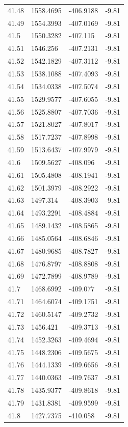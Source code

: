 \begin{table}[H]
\begin{tabular}{llll}
41.48 & 1558.4695 & -406.9188 & -9.81 \\
41.49 & 1554.3993 & -407.0169 & -9.81 \\
41.5 & 1550.3282 & -407.115 & -9.81 \\
41.51 & 1546.256 & -407.2131 & -9.81 \\
41.52 & 1542.1829 & -407.3112 & -9.81 \\
41.53 & 1538.1088 & -407.4093 & -9.81 \\
41.54 & 1534.0338 & -407.5074 & -9.81 \\
41.55 & 1529.9577 & -407.6055 & -9.81 \\
41.56 & 1525.8807 & -407.7036 & -9.81 \\
41.57 & 1521.8027 & -407.8017 & -9.81 \\
41.58 & 1517.7237 & -407.8998 & -9.81 \\
41.59 & 1513.6437 & -407.9979 & -9.81 \\
41.6 & 1509.5627 & -408.096 & -9.81 \\
41.61 & 1505.4808 & -408.1941 & -9.81 \\
41.62 & 1501.3979 & -408.2922 & -9.81 \\
41.63 & 1497.314 & -408.3903 & -9.81 \\
41.64 & 1493.2291 & -408.4884 & -9.81 \\
41.65 & 1489.1432 & -408.5865 & -9.81 \\
41.66 & 1485.0564 & -408.6846 & -9.81 \\
41.67 & 1480.9685 & -408.7827 & -9.81 \\
41.68 & 1476.8797 & -408.8808 & -9.81 \\
41.69 & 1472.7899 & -408.9789 & -9.81 \\
41.7 & 1468.6992 & -409.077 & -9.81 \\
41.71 & 1464.6074 & -409.1751 & -9.81 \\
41.72 & 1460.5147 & -409.2732 & -9.81 \\
41.73 & 1456.421 & -409.3713 & -9.81 \\
41.74 & 1452.3263 & -409.4694 & -9.81 \\
41.75 & 1448.2306 & -409.5675 & -9.81 \\
41.76 & 1444.1339 & -409.6656 & -9.81 \\
41.77 & 1440.0363 & -409.7637 & -9.81 \\
41.78 & 1435.9377 & -409.8618 & -9.81 \\
41.79 & 1431.8381 & -409.9599 & -9.81 \\
41.8 & 1427.7375 & -410.058 & -9.81 \\

\end{tabular}
\end{table}
